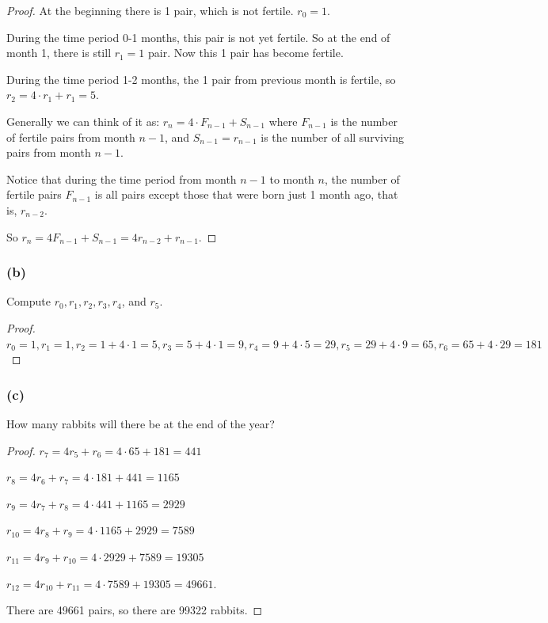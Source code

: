 \documentclass[14pt]{extarticle}
\begin{document}
\begin{proof}
At the beginning there is 1 pair, which is not fertile. $r_0 = 1$.

During the time period 0-1 months, this pair is not yet fertile. So at the end of month 1, there is still $r_1 = 1$
pair. Now this 1 pair has become fertile.

During the time period 1-2 months, the 1 pair from previous month is fertile, so $r_2 = 4 \cdot r_1 + r_1 = 5$.

Generally we can think of it as: $r_n = 4 \cdot F_{n-1} + S_{n-1}$ where $F_{n-1}$ is the number of fertile pairs 
from month $n-1$, and $S_{n-1} = r_{n-1}$ is the number of all surviving pairs from month $n-1$.

Notice that during the time period from month $n-1$ to month $n$, the number of fertile pairs $F_{n-1}$ is all 
pairs except those that were born just 1 month ago, that is, $r_{n-2}$.

So $r_n = 4F_{n-1} + S_{n-1} = 4r_{n-2} + r_{n-1}$.
\end{proof}

\subsubsection{(b)}
Compute $r_0, r_1, r_2, r_3, r_4$, and $r_5$.

\begin{proof}
$r_0 = 1, r_1 = 1, r_2 = 1 + 4\cdot1 = 5, r_3 = 5 + 4\cdot1 = 9, r_4 = 9 + 4\cdot5 = 29, r_5 = 29 + 4\cdot9 = 65, 
r_6 = 65 + 4\cdot29 = 181$
\end{proof}

\subsubsection{(c)}
How many rabbits will there be at the end of the year?

\begin{proof}
$r_7 = 4r_5 + r_6 = 4 \cdot 65 + 181 = 441$

$r_8 = 4r_6 + r_7 = 4 \cdot 181 + 441 = 1165$

$r_9 = 4r_7 + r_8 = 4 \cdot 441 + 1165 = 2929$

$r_{10} = 4r_8 + r_9 = 4 \cdot 1165 + 2929 = 7589$

$r_{11} = 4r_9 + r_{10} = 4 \cdot 2929 + 7589 = 19305$

$r_{12} = 4r_{10} + r_{11} = 4 \cdot 7589 + 19305 = 49661$.

There are 49661 pairs, so there are 99322 rabbits.
\end{proof}
\end{document}
